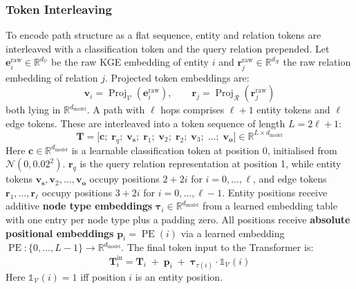 \documentclass[runningheads]{llncs}
\begin{document}
\subsubsection{Token Interleaving}
\label{sec:token-interleaving}

To encode path structure as a flat sequence, entity and relation tokens are interleaved
with a classification token and the query relation prepended.
Let $\mathbf{e}^{\text{raw}}_i \in \mathbb{R}^{d_{\mathcal{V}}}$ be the raw KGE embedding
of entity $i$ and $\mathbf{r}^{\text{raw}}_j \in \mathbb{R}^{d_{\mathcal{R}}}$ the raw
relation embedding of relation $j$.
Projected token embeddings are:
\begin{equation}
  \mathbf{v}_i = \operatorname{Proj}_{\mathcal{V}}(\mathbf{e}^{\text{raw}}_i),\qquad
  \mathbf{r}_j = \operatorname{Proj}_{\mathcal{R}}(\mathbf{r}^{\text{raw}}_j)
  \label{eq:token-proj}
\end{equation}
both lying in $\mathbb{R}^{d_{\text{model}}}$.
A path with $\ell$ hops comprises $\ell+1$ entity tokens and $\ell$ edge tokens.
These are interleaved into a token sequence of length $L = 2\ell + 1$:
\begin{equation}
  \mathbf{T} = \bigl[\mathbf{c};\; \mathbf{r}_q;\;
    \mathbf{v}_{\mathbf{s}};\; \mathbf{r}_{1};\; \mathbf{v}_{2};\; \mathbf{r}_{2};\;
  \mathbf{v}_{3};\; \ldots;\; \mathbf{v}_{\mathbf{o}}\bigr]
  \in \mathbb{R}^{L \times d_{\text{model}}}
  \label{eq:token-seq}
\end{equation}
Here $\mathbf{c} \in \mathbb{R}^{d_{\text{model}}}$ is a learnable classification token
at position 0, initialised from $\mathcal{N}(0, 0.02^2)$.
$\mathbf{r}_q$ is the query
relation representation at position 1, while entity tokens $\mathbf{v}_{\mathbf{s}}, \mathbf{v}_{2}, \ldots, \mathbf{v}_{\mathbf{o}}$
occupy positions $2 + 2i$ for $i = 0, \ldots, \ell$, and edge tokens $\mathbf{r}_{1}, \ldots, \mathbf{r}_{\ell}$
occupy positions $3 + 2i$ for $i = 0, \ldots, \ell - 1$.
Entity positions receive additive \textbf{node type embeddings}
$\boldsymbol{\tau}_i \in \mathbb{R}^{d_{\text{model}}}$ from a learned embedding table
with one entry per node type plus a padding zero.
All positions receive \textbf{absolute positional embeddings}
$\mathbf{p}_i = \operatorname{PE}(i)$ via a learned embedding
$\operatorname{PE}: \{0, \ldots, L-1\} \to \mathbb{R}^{d_{\text{model}}}$.
The final token input to the Transformer is:
\begin{equation}
  \mathbf{T}^{\text{in}}_i = \mathbf{T}_i \;+\; \mathbf{p}_i \;+\; \boldsymbol{\tau}_{\tau(i)} \cdot \mathbb{1}_{\mathcal{V}}(i)
  \label{eq:token-in}
\end{equation}
Here $\mathbb{1}_{\mathcal{V}}(i) = 1$ iff position $i$ is an entity position.
\end{document}
